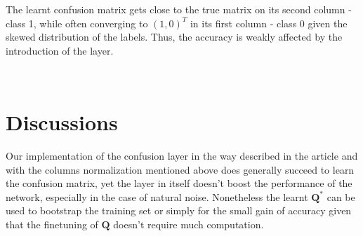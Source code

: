 \documentclass[10pt,twocolumn,letterpaper]{article}
\newcommand{\Q}{\mathbf{Q}}
\begin{document}
The learnt confusion matrix gets close to the true matrix on its second column - class 1, while often converging to $(1,0)^T$ in its first column - class 0 given the skewed distribution of the labels. Thus, the accuracy is weakly affected by the introduction of the layer.

\begin{table}[H]
\centering
{}
\\
\caption{Confusion matrices: the learnt and the truly used to generate the noisy labels}
\end{table}

\section{Discussions}
Our implementation of the confusion layer in the way described in the article and with the columns normalization mentioned above does generally succeed to learn the confusion matrix, yet the layer in itself doesn't boost the performance of the network, especially in the case of natural noise. Nonetheless the learnt $\Q^*$ can be used to bootstrap the training set or simply for the small gain of accuracy given that the finetuning of $\Q$ doesn't require much computation.
{\small


}
\end{document}
